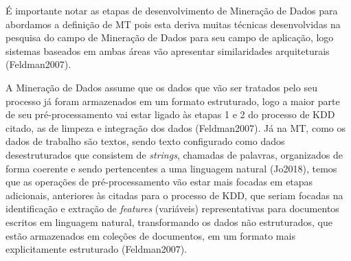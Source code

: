
É importante notar as etapas de desenvolvimento de Mineração de Dados para abordamos a definição de MT pois esta deriva muitas técnicas desenvolvidas na pesquisa do campo de Mineração de Dados para seu campo de aplicação, logo sistemas baseados em ambas áreas vão apresentar similaridades arquiteturais (Feldman2007). 



A Mineração de Dados assume que os dados que vão ser tratados pelo seu processo já foram armazenados em um formato estruturado, logo a maior parte de seu pré-processamento vai estar ligado às etapas 1 e 2 do processo de KDD citado, as de limpeza e integração dos dados (Feldman2007). 
Já na MT, como os dados de trabalho são textos, sendo texto configurado como dados desestruturados que consistem de \textit{strings}, chamadas de palavras, organizados de forma coerente e sendo pertencentes a uma linguagem natural (Jo2018), temos que as operações de pré-processamento vão estar mais focadas em etapas adicionais, anteriores às citadas para o processo de KDD, que seriam focadas na identificação e extração de \textit{features} (variáveis) representativas para documentos escritos em linguagem natural, transformando os dados não estruturados, que estão armazenados em coleções de documentos, em um formato mais explicitamente estruturado (Feldman2007).



